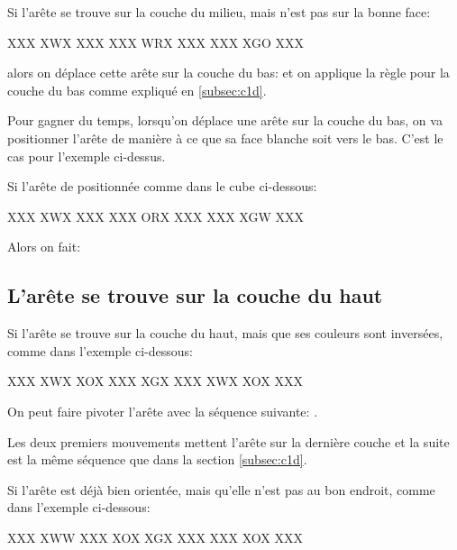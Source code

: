 Si l'arête se trouve sur la couche du milieu, mais n’est pas sur la bonne face:

\begin{center}
	\RubikFaceUp%
	{X}{X}{X}%
	{X}{W}{X}%
	{X}{X}{X}
	\RubikFaceRight%
	{X}{X}{X}%
	{W}{R}{X}%
	{X}{X}{X}
	\RubikFaceFront%
	{X}{X}{X}%
	{X}{G}{O}%
	{X}{X}{X}
\end{center}

alors on déplace cette arête sur la couche du bas:  et on applique la règle pour la couche du bas comme expliqué en \ref{subsec:c1d}.


Pour gagner du temps, lorsqu'on déplace une arête sur la couche du bas, on va positionner l'arête de manière à ce que sa face blanche soit vers le bas. C'est le cas pour l'exemple ci-dessus.

Si l'arête de positionnée comme dans le cube ci-dessous:

\begin{center}
	\RubikFaceUp%
	{X}{X}{X}%
	{X}{W}{X}%
	{X}{X}{X}
	\RubikFaceRight%
	{X}{X}{X}%
	{O}{R}{X}%
	{X}{X}{X}
	\RubikFaceFront%
	{X}{X}{X}%
	{X}{G}{W}%
	{X}{X}{X}
\end{center}

Alors on fait: 

\subsection{L'arête se trouve sur la couche du haut}

Si l'arête se trouve sur la couche du haut, mais que ses couleurs sont inversées, comme dans l'exemple ci-dessous:

\begin{center}
	\RubikFaceUp%
	{X}{X}{X}%
	{X}{W}{X}%
	{X}{O}{X}
	\RubikFaceRight%
	{X}{X}{X}%
	{X}{G}{X}%
	{X}{X}{X}
	\RubikFaceFront%
	{X}{W}{X}%
	{X}{O}{X}%
	{X}{X}{X}
\end{center}

On peut faire pivoter l'arête avec la séquence suivante: .

Les deux premiers mouvements mettent l'arête sur la dernière couche et la suite est la même séquence que dans la section \ref{subsec:c1d}.

\begin{samepage}
Si l'arête est déjà bien orientée, mais qu'elle n'est pas au bon endroit, comme dans l'exemple ci-dessous:

\begin{center}
	\RubikFaceUp%
	{X}{X}{X}%
	{X}{W}{W}%
	{X}{X}{X}
	\RubikFaceRight%
	{X}{O}{X}%
	{X}{G}{X}%
	{X}{X}{X}
	\RubikFaceFront%
	{X}{X}{X}%
	{X}{O}{X}%
	{X}{X}{X}
\end{center}
\end{samepage}


